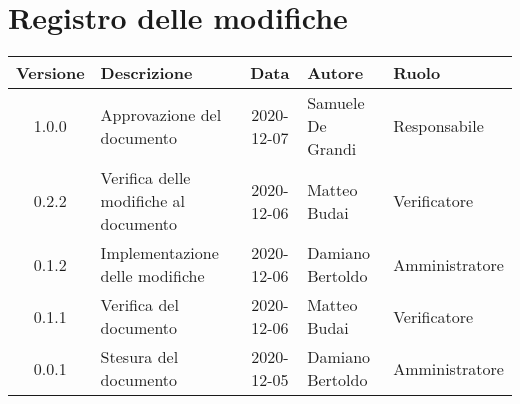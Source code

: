\section*{Registro delle modifiche}

\begin{center}
	\begin{longtable}{|c|p{3.5cm}|c|p{3.1cm}|p{3cm}|}
	\hline
	\rowcolor{lighter-grayer}
	\textbf{Versione} & \textbf{Descrizione} & \textbf{Data} & \textbf{Autore} & \textbf{Ruolo} \\
	\hline
	\endfirsthead

	1.0.0 & Approvazione del documento & 2020-12-07 & Samuele De Grandi & Responsabile \\
	\hline
	0.2.2 & Verifica delle modifiche al documento & 2020-12-06 & Matteo Budai & Verificatore \\
	\hline
    0.1.2 & Implementazione delle modifiche & 2020-12-06 & Damiano Bertoldo & Amministratore \\
    \hline
    0.1.1 & Verifica del documento & 2020-12-06 & Matteo Budai & Verificatore \\
    \hline
    0.0.1 & Stesura del documento & 2020-12-05 & Damiano Bertoldo & Amministratore \\
    \hline
	\end{longtable}
\end{center}
